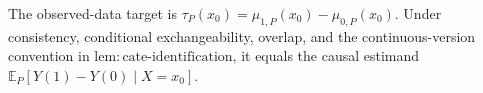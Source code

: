 The observed-data target is \(\tau_P(x_0)=\mu_{1,P}(x_0)-\mu_{0,P}(x_0)\).  Under consistency, conditional exchangeability, overlap, and the continuous-version convention in \(\mathrm{lem:cate\mbox{-}identification}\), it equals the causal estimand \(\mathbb E_P[Y(1)-Y(0)\mid X=x_0]\).